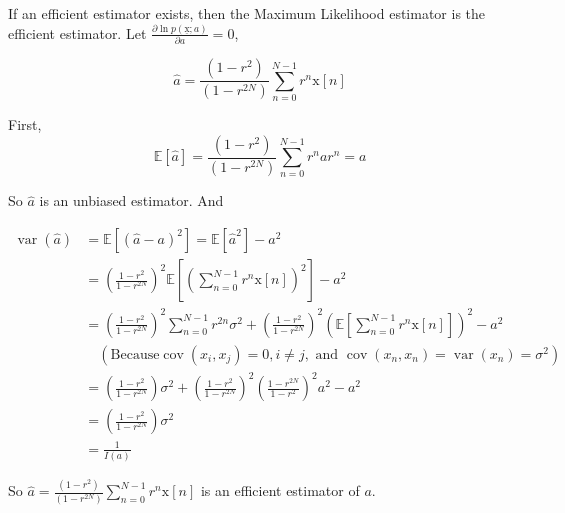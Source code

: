 \documentclass[a4paper]{article}
\begin{document}
\begin{enumerate}
If an efficient estimator exists, then the Maximum Likelihood estimator is the efficient estimator. Let $ \frac{\partial \ln p(\underline{\mathrm{x}};a)}{ \partial a} = 0$,

\begin{equation}
  \hat a= \frac{(1-r^2)}{(1-r^{2N})} \sum_{n=0}^{N-1} r^n \mathrm{x}[n]
\end{equation}

First,
\begin{equation}
  \mathbb{E}[\hat a ] = \frac{(1-r^2)}{(1-r^{2N})} \sum_{n=0}^{N-1} r^n a r^n = a
\end{equation}

So $\hat a$ is an unbiased estimator. And 

\begin{equation}
  \begin{aligned}
    \operatorname{var}(\hat a) &  = \mathbb{E}[(\hat a -a)^2] = \mathbb{E}[\hat{a}^2] - a^2 \\
  & = \left(\frac{1-r^2}{1-r^{2N}}\right)^2 \mathbb{E} \left[\left(\sum_{n=0}^{N-1} r^n \mathrm{x}[n] \right)^2\right] -a^2 \\
  & = \left(\frac{1-r^2}{1-r^{2N}}\right)^2 \sum_{n=0}^{N-1} r^{2n} \sigma^2  + \left(\frac{1-r^2}{1-r^{2N}}\right)^2 \left(\mathbb{E} \left[\sum_{n=0}^{N-1} r^n \mathrm{x}[n] \right]\right)^2 - a^2 \\ 
  & \quad (\text{Because} \operatorname{cov}(x_i,x_j) = 0,i\neq j,  \text{ and } \operatorname{cov}(x_n,x_n) = \operatorname{var}(x_n) = \sigma^2)\\
  & = \left(\frac{1-r^2}{1-r^{2N}}\right) \sigma^2 + \left(\frac{1-r^2}{1-r^{2N}}\right)^2  \left(\frac{1-r^{2N}}{1-r^{2}}\right)^2 a^2 - a^2 \\
  & = \left(\frac{1-r^2}{1-r^{2N}}\right) \sigma^2 \\
  & = \frac{1}{I(a)}
  \end{aligned}
\end{equation}

So $\hat a= \frac{(1-r^2)}{(1-r^{2N})} \sum_{n=0}^{N-1} r^n \mathrm{x}[n]$ is an efficient estimator of $a$.
\end{enumerate}
  

  
\end{document}
